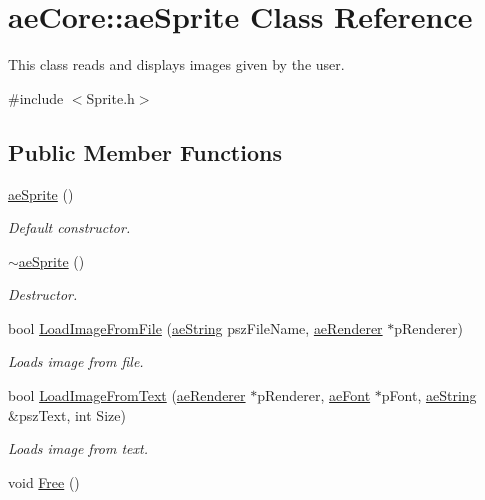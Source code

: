 \hypertarget{classae_core_1_1ae_sprite}{}\section{ae\+Core\+:\+:ae\+Sprite Class Reference}
\label{classae_core_1_1ae_sprite}


This class reads and displays images given by the user.  




{\ttfamily \#include $<$Sprite.\+h$>$}

\subsection*{Public Member Functions}
\begin{DoxyCompactItemize}
\item 
\hyperlink{classae_core_1_1ae_sprite_af0831df244e64f7286384f7505e263d9}{ae\+Sprite} ()\hypertarget{classae_core_1_1ae_sprite_af0831df244e64f7286384f7505e263d9}{}\label{classae_core_1_1ae_sprite_af0831df244e64f7286384f7505e263d9}

\begin{DoxyCompactList}\small\item\em Default constructor. \end{DoxyCompactList}\item 
\hyperlink{classae_core_1_1ae_sprite_abae79605805258977e20e0dd4e86e2f4}{$\sim$ae\+Sprite} ()\hypertarget{classae_core_1_1ae_sprite_abae79605805258977e20e0dd4e86e2f4}{}\label{classae_core_1_1ae_sprite_abae79605805258977e20e0dd4e86e2f4}

\begin{DoxyCompactList}\small\item\em Destructor. \end{DoxyCompactList}\item 
bool \hyperlink{classae_core_1_1ae_sprite_a47c5c7900491b50bc27e0ff4f9604612}{Load\+Image\+From\+File} (\hyperlink{namespaceae_core_ad6f85aacc0d1fdd85e458e2413e60010}{ae\+String} psz\+File\+Name, \hyperlink{classae_core_1_1ae_renderer}{ae\+Renderer} $\ast$p\+Renderer)
\begin{DoxyCompactList}\small\item\em Loads image from file. \end{DoxyCompactList}\item 
bool \hyperlink{classae_core_1_1ae_sprite_a78a94a3b8e133c094935ef37470d2c43}{Load\+Image\+From\+Text} (\hyperlink{classae_core_1_1ae_renderer}{ae\+Renderer} $\ast$p\+Renderer, \hyperlink{classae_core_1_1ae_font}{ae\+Font} $\ast$p\+Font, \hyperlink{namespaceae_core_ad6f85aacc0d1fdd85e458e2413e60010}{ae\+String} \&psz\+Text, int Size)
\begin{DoxyCompactList}\small\item\em Loads image from text. \end{DoxyCompactList}\item 
void \hyperlink{classae_core_1_1ae_sprite_a40fc5810e02f0314c4005e1b28164389}{Free} ()\hypertarget{classae_core_1_1ae_sprite_a40fc5810e02f0314c4005e1b28164389}{}\label{classae_core_1_1ae_sprite_a40fc5810e02f0314c4005e1b28164389}


\end{DoxyCompactItemize}

